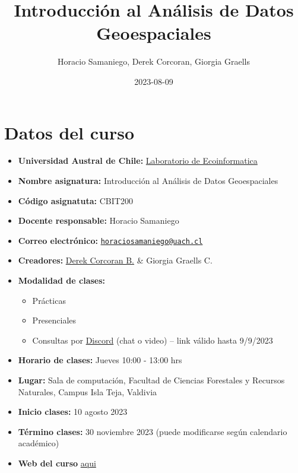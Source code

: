 \documentclass[
]{book}
\title{Introducción al Análisis de Datos Geoespaciales}
\author{Horacio Samaniego, Derek Corcoran, Giorgia Graells}
\date{2023-08-09}
\providecommand{\tightlist}{%
  \setlength{\itemsep}{0pt}\setlength{\parskip}{0pt}}
\begin{document}
\maketitle

{
\setcounter{tocdepth}{1}
\tableofcontents
}
\hypertarget{datos-del-curso}{%
\chapter{Datos del curso}\label{datos-del-curso}}

\begin{itemize}
\tightlist
\item
  \textbf{Universidad Austral de Chile:} \href{http://www.ecoinformatica.cl}{Laboratorio de Ecoinformatica}
\item
  \textbf{Nombre asignatura:} Introducción al Análisis de Datos Geoespaciales
\item
  \textbf{Código asignatuta:} CBIT200
\item
  \textbf{Docente responsable:} Horacio Samaniego
\item
  \textbf{Correo electrónico:} \href{mailto:horaciosamaniego@uach.cl}{\nolinkurl{horaciosamaniego@uach.cl}}
\item
  \textbf{Creadores:} \href{https://derek-corcoran-barrios.github.io/}{Derek Corcoran B.} \& Giorgia Graells C.
\item
  \textbf{Modalidad de clases:}

  \begin{itemize}
  \tightlist
  \item
    Prácticas
  \item
    Presenciales
  \item
    Consultas por \href{https://discord.gg/TWGvq53tm}{Discord} (chat o video) -- link válido hasta 9/9/2023
  \end{itemize}
\item
  \textbf{Horario de clases:} Jueves 10:00 - 13:00 hrs
\item
  \textbf{Lugar:} Sala de computación, Facultad de Ciencias Forestales y Recursos Naturales, Campus Isla Teja, Valdivia
\item
  \textbf{Inicio clases:} 10 agosto 2023
\item
  \textbf{Término clases:} 30 noviembre 2023 (puede modificarse según calendario académico)
\item
  \textbf{Web del curso} \href{https://cbit200-programacion-geoespacial.github.io/}{aqui}
\end{itemize}
\end{document}
